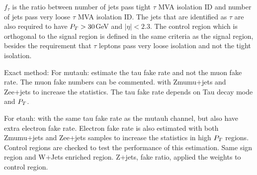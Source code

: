$f_{\tau}$ is the ratio between number of jets pass tight $\tau$ MVA isolation ID and number of jets pass very loose $\tau$ MVA isolation ID. The jets that are identified as $\tau$ are also required to have $P_{T}>30$GeV and $|\eta|<2.3$. The control region which is orthogonal to the signal region is defined in the same criteria as the signal region, besides the requirement that $\tau$ leptons pass very loose isolation and not the tight isolation.  




Exact method: 
For mutauh: estimate the tau fake rate and not the muon fake rate. The muon fake numbers can be commented.  with Zmumu+jets and Zee+jets to increase the statistics. 
The tau fake rate depends on Tau decay mode and $P_{T}$.



For etauh: with the same tau fake rate as the mutauh channel, but also have extra electron fake rate. Electron fake rate is also estimated with both Zmumu+jets and Zee+jets samples to increase the statistics in high $P_{T}$ regions. 
Control regions are checked to test the performance of this estimation. Same sign region and W+Jets enriched region. 
Z+jets, fake ratio,  applied the weights to control region. 

